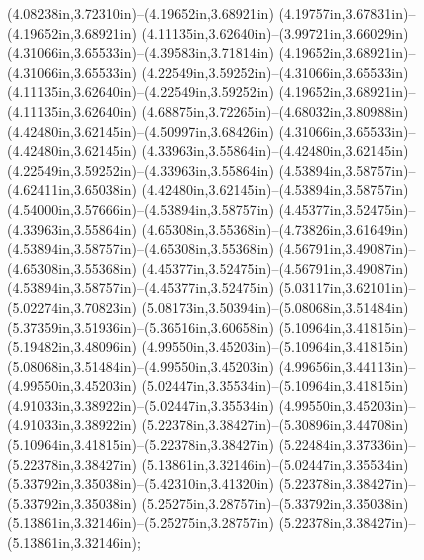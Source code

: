 (4.08238in,3.72310in)--(4.19652in,3.68921in) (4.19757in,3.67831in)--(4.19652in,3.68921in) (4.11135in,3.62640in)--(3.99721in,3.66029in) (4.31066in,3.65533in)--(4.39583in,3.71814in) (4.19652in,3.68921in)--(4.31066in,3.65533in) (4.22549in,3.59252in)--(4.31066in,3.65533in) (4.11135in,3.62640in)--(4.22549in,3.59252in) (4.19652in,3.68921in)--(4.11135in,3.62640in) (4.68875in,3.72265in)--(4.68032in,3.80988in) (4.42480in,3.62145in)--(4.50997in,3.68426in) (4.31066in,3.65533in)--(4.42480in,3.62145in) (4.33963in,3.55864in)--(4.42480in,3.62145in) (4.22549in,3.59252in)--(4.33963in,3.55864in) (4.53894in,3.58757in)--(4.62411in,3.65038in) (4.42480in,3.62145in)--(4.53894in,3.58757in) (4.54000in,3.57666in)--(4.53894in,3.58757in) (4.45377in,3.52475in)--(4.33963in,3.55864in) (4.65308in,3.55368in)--(4.73826in,3.61649in) (4.53894in,3.58757in)--(4.65308in,3.55368in) (4.56791in,3.49087in)--(4.65308in,3.55368in) (4.45377in,3.52475in)--(4.56791in,3.49087in) (4.53894in,3.58757in)--(4.45377in,3.52475in) (5.03117in,3.62101in)--(5.02274in,3.70823in) (5.08173in,3.50394in)--(5.08068in,3.51484in) (5.37359in,3.51936in)--(5.36516in,3.60658in) (5.10964in,3.41815in)--(5.19482in,3.48096in) (4.99550in,3.45203in)--(5.10964in,3.41815in) (5.08068in,3.51484in)--(4.99550in,3.45203in) (4.99656in,3.44113in)--(4.99550in,3.45203in) (5.02447in,3.35534in)--(5.10964in,3.41815in) (4.91033in,3.38922in)--(5.02447in,3.35534in) (4.99550in,3.45203in)--(4.91033in,3.38922in) (5.22378in,3.38427in)--(5.30896in,3.44708in) (5.10964in,3.41815in)--(5.22378in,3.38427in) (5.22484in,3.37336in)--(5.22378in,3.38427in) (5.13861in,3.32146in)--(5.02447in,3.35534in) (5.33792in,3.35038in)--(5.42310in,3.41320in) (5.22378in,3.38427in)--(5.33792in,3.35038in) (5.25275in,3.28757in)--(5.33792in,3.35038in) (5.13861in,3.32146in)--(5.25275in,3.28757in) (5.22378in,3.38427in)--(5.13861in,3.32146in);
